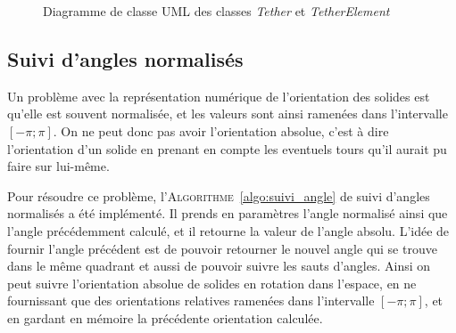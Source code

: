 				\begin{figure}[!htb]
					\centering
					\caption{Diagramme de classe UML des classes \textit{Tether} et \textit{TetherElement}}
					\label{fig:uml_class}
				\end{figure}
			
			\subsection{Suivi d'angles normalisés}
				Un problème avec la représentation numérique de l'orientation des solides est qu'elle est souvent normalisée, et les valeurs sont ainsi ramenées dans l'intervalle $[-\pi; \pi]$. On ne peut donc pas avoir l'orientation absolue, c'est à dire l'orientation d'un solide en prenant en compte les eventuels tours qu'il aurait pu faire sur lui-même.
			
				Pour résoudre ce problème, l'\textsc{Algorithme}~\ref{algo:suivi_angle} de suivi d'angles normalisés a été implémenté. Il prends en paramètres l'angle normalisé ainsi que l'angle précédemment calculé, et il retourne la valeur de l'angle absolu. L'idée de fournir l'angle précédent est de pouvoir retourner le nouvel angle qui se trouve dans le même quadrant et aussi de pouvoir suivre les sauts d'angles. Ainsi on peut suivre l'orientation absolue de solides en rotation dans l'espace, en ne fournissant que des orientations relatives ramenées dans l'intervalle $[-\pi; \pi]$, et en gardant en mémoire la précédente orientation calculée.
				
